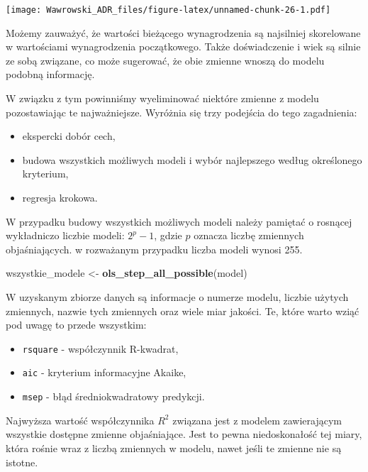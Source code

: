\documentclass[
]{book}
\newenvironment{Shaded}{\begin{snugshade}}{\end{snugshade}}
\newcommand{\KeywordTok}[1]{\textcolor[rgb]{0.13,0.29,0.53}{\textbf{#1}}}
\newcommand{\NormalTok}[1]{#1}
\newcommand{\StringTok}[1]{\textcolor[rgb]{0.31,0.60,0.02}{#1}}
\providecommand{\tightlist}{%
  \setlength{\itemsep}{0pt}\setlength{\parskip}{0pt}}
\begin{document}
\texttt{[image: Wawrowski\_ADR\_files/figure-latex/unnamed-chunk-26-1.pdf]}

Możemy zauważyć, że wartości bieżącego wynagrodzenia są najsilniej skorelowane w wartościami wynagrodzenia początkowego. Także doświadczenie i wiek są silnie ze sobą związane, co może sugerować, że obie zmienne wnoszą do modelu podobną informację.

W związku z tym powinniśmy wyeliminować niektóre zmienne z modelu pozostawiając te najważniejsze. Wyróżnia się trzy podejścia do tego zagadnienia:

\begin{itemize}
\tightlist
\item
  ekspercki dobór cech,
\item
  budowa wszystkich możliwych modeli i wybór najlepszego według określonego kryterium,
\item
  regresja krokowa.
\end{itemize}

W przypadku budowy wszystkich możliwych modeli należy pamiętać o rosnącej wykładniczo liczbie modeli: \(2^p-1\), gdzie \(p\) oznacza liczbę zmiennych objaśniających. w rozważanym przypadku liczba modeli wynosi 255.

\begin{Shaded}
\begin{Highlighting}[]
\NormalTok{wszystkie_modele <-}\StringTok{ }\KeywordTok{ols_step_all_possible}\NormalTok{(model)}
\end{Highlighting}
\end{Shaded}

W uzyskanym zbiorze danych są informacje o numerze modelu, liczbie użytych zmiennych, nazwie tych zmiennych oraz wiele miar jakości. Te, które warto wziąć pod uwagę to przede wszystkim:

\begin{itemize}
\tightlist
\item
  \texttt{rsquare} - współczynnik R-kwadrat,
\item
  \texttt{aic} - kryterium informacyjne Akaike,
\item
  \texttt{msep} - błąd średniokwadratowy predykcji.
\end{itemize}

Najwyższa wartość współczynnika \(R^2\) związana jest z modelem zawierającym wszystkie dostępne zmienne objaśniające. Jest to pewna niedoskonałość tej miary, która rośnie wraz z liczbą zmiennych w modelu, nawet jeśli te zmienne nie są istotne.
\end{document}
